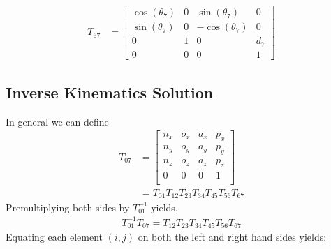 \documentclass[onecolumn,10pt]{jhwhw}
\begin{document}
\begin{align*}
T_{67} &=
\left[\begin{matrix}\cos{\left (\theta_{7} \right )} & 0 & \sin{\left (\theta_{7} \right )} & 0\\\sin{\left (\theta_{7} \right )} & 0 & - \cos{\left (\theta_{7} \right )} & 0\\0 & 1 & 0 & d_{7}\\0 & 0 & 0 & 1\end{matrix}\right]
\end{align*}

\subsection{Inverse Kinematics Solution}
In general we can define
\begin{align*}
T_{07} &=
\left[\begin{matrix}
n_x & o_x & a_x & p_x \\
n_y & o_y & a_y & p_y \\
n_z & o_z & a_z & p_z \\
  0 &   0 &   0 &   1 \\
\end{matrix}\right]\\
&= T_{01} T_{12} T_{23} T_{34} T_{45} T_{56} T_{67}
\end{align*}
Premultiplying both sides by $T_{01}^{-1}$ yields,
\begin{align*}
T_{01}^{-1} T_{07} = T_{12} T_{23} T_{34} T_{45} T_{56} T_{67}
\end{align*}
Equating each element $(i,j)$ on both the left and right hand sides yields:
\end{document}
